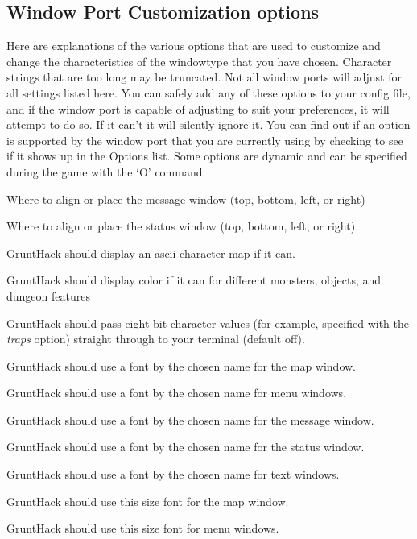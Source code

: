 \subsection*{Window Port Customization options}

Here are explanations of the various options that are
used to customize and change the characteristics of the
windowtype that you have chosen.
Character strings that are too long may be truncated.
Not all window ports will adjust for all settings listed
here.  You can safely add any of these options to your config
file, and if the window port is capable of adjusting to
suit your preferences, it will attempt to do so. If it
can't it will silently ignore it.  You can find out if an
option is supported by the window port that you are currently
using by checking to see if it shows up in the Options list.
Some options are dynamic and can be specified during the game
with the `O' command.
\blist{}
\item[\tb{align\_message}]
Where to align or place the message window (top, bottom, left, or right)
\item[\tb{align\_status}]
Where to align or place the status window (top, bottom, left, or right).
\item[\tb{ascii\_map}]
GruntHack should display an ascii character map if it can.
\item[\tb{color		}]
GruntHack should display color if it can for different monsters, 
objects, and dungeon features
\item[\tb{eight\_bit\_tty	}]
GruntHack should pass eight-bit character values (for example, specified with
the
{\it traps }
option) straight through to your terminal (default off).
\item[\tb{font\_map	}]
GruntHack should use a font by the chosen name for the map window.
\item[\tb{font\_menu	}]
GruntHack should use a font by the chosen name for menu windows.
\item[\tb{font\_message	}]
GruntHack should use a font by the chosen name for the message window.
\item[\tb{font\_status	}]
GruntHack should use a font by the chosen name for the status window.
\item[\tb{font\_text	}]
GruntHack should use a font by the chosen name for text windows.
\item[\tb{font\_size\_map	}]
GruntHack should use this size font for the map window.
\item[\tb{font\_size\_menu	}]
GruntHack should use this size font for menu windows.
